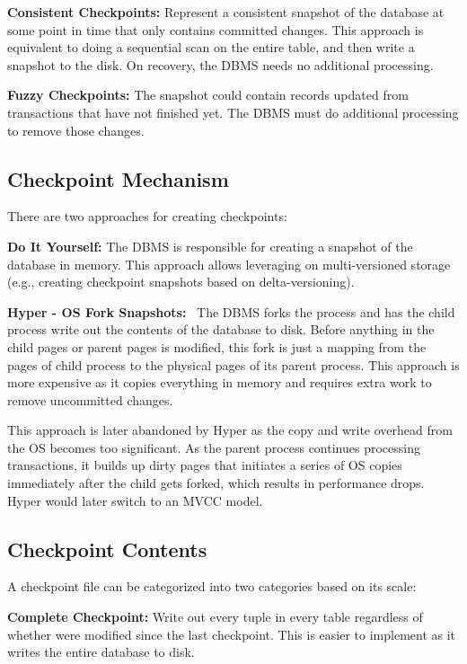 \documentclass[11pt]{article}
\begin{document}
\textbf{Consistent Checkpoints:} Represent a consistent snapshot of the database at some point in time that only contains committed changes. This approach is equivalent to doing a sequential scan on the entire table, and then write a snapshot to the disk. On recovery, the DBMS needs no additional processing.

\textbf{Fuzzy Checkpoints:} The snapshot could contain records updated from transactions that have not finished yet. The DBMS must do additional processing to remove those changes.

\subsection*{Checkpoint Mechanism}
There are two approaches for creating checkpoints:

\textbf{Do It Yourself:} The DBMS is responsible for creating a snapshot of the database in memory. This approach allows leveraging on multi-versioned storage (e.g., creating checkpoint snapshots based on delta-versioning).

\textbf{Hyper - OS Fork Snapshots:}~\cite{5767867} The DBMS forks the process and has the child process write out the contents of the database to disk. Before anything in the child pages or parent pages is modified, this fork is just a mapping from the pages of child process to the physical pages of its parent process. This approach is more expensive as it copies everything in memory and requires extra work to remove uncommitted changes. 

This approach is later abandoned by Hyper as the copy and write overhead from the OS becomes too significant. As the parent process continues processing transactions, it builds up dirty pages that initiates a series of OS copies immediately after the child gets forked, which results in performance drops. Hyper would later switch to an MVCC model.

\subsection*{Checkpoint Contents}
A checkpoint file can be categorized into two categories based on its scale:

\textbf{Complete Checkpoint:} Write out every tuple in every table regardless of whether were modified since the last checkpoint. This is easier to implement as it writes the entire database to disk.
\end{document}
